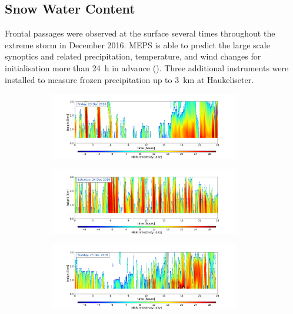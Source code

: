\subsection{Snow Water Content}
\label{sec:res:large_scale_vert}
Frontal passages were observed at the surface several times throughout the extreme storm in December 2016. MEPS is able to predict the large scale synoptics and related precipitation, temperature, and wind changes for initialisation more than \SI{24}{\hour} in advance (). Three additional instruments were installed %
to measure frozen precipitation up to \SI{3}{\km} at Haukeliseter. 
\begin{figure}[H]
	\centering
	\begin{subfigure}[t]{\textwidth}
		\centering
		\includegraphics[trim={4.cm 2.5cm 4.5cm 1.5cm},clip,width=0.91\textwidth]{./fig_MRR_refl/MRR_20161223}
		\caption{}\label{fig:ret:refl23}
	\end{subfigure}
	\begin{subfigure}[t]{\textwidth}
		\centering
		\includegraphics[trim={4.cm 2.5cm 4.5cm 1.5cm},clip,width=0.91\textwidth]{./fig_MRR_refl/MRR_20161224}
		\caption{}\label{fig:ret:refl24}
	\end{subfigure}
	\begin{subfigure}[t]{\textwidth}
		\centering
		\includegraphics[trim={4.cm 2.5cm 4.5cm 1.5cm},clip,width=0.91\textwidth]{./fig_MRR_refl/MRR_20161225}

\end{subfigure}
\end{figure}
